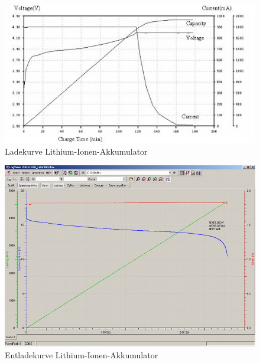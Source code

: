 \begin{figure}[h!]
	\centering
\includegraphics[width=1.0\textwidth]{images/liion_ladekurve.jpg}
	\caption{Ladekurve Lithium-Ionen-Akkumulator \cite{liion_ladekurve}}
\label{fig:liion_akku_ladekurve}
\end{figure}

\begin{figure}[h!]
	\centering
\includegraphics[width=1.0\textwidth]{images/liion_entladekurve.jpg}
	\caption{Entladekurve Lithium-Ionen-Akkumulator \cite{liion_entladekurve}}
\label{fig:liion_akku_entladekurve}
\end{figure}

\newpage

